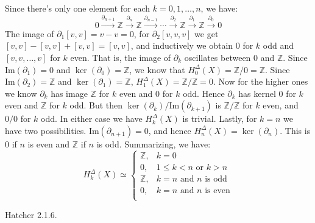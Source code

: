 \documentclass{book}                                                           %
\begin{document}
\begin{solution}
    Since there's only one element for each $k=0,1,\dots,n$, we have:
    \begin{equation}
        0\overset{\partial_{n+1}}{\longrightarrow}\mathbb{Z}
        \overset{\partial_{n}}{\longrightarrow}\mathbb{Z}
        \overset{\partial_{n-1}}{\longrightarrow}
        \cdots
        \overset{\partial_{2}}{\longrightarrow}\mathbb{Z}
        \overset{\partial_{1}}{\longrightarrow}\mathbb{Z}
        \overset{\partial_{0}}{\longrightarrow}0
    \end{equation}
    The image of $\partial_{1}[v,v]=v-v=0$, for $\partial_{2}[v,v,v]$ we get
    $[v,v]-[v,v]+[v,v]=[v,v]$, and inductively we obtain $0$ for $k$ odd and
    $[v,v,\dots,v]$ for $k$ even. That is, the image of $\partial_{k}$
    oscillates between $0$ and $\mathbb{Z}$. Since $\textrm{Im}(\partial_{1})=0$
    and $\ker(\partial_{0})=\mathbb{Z}$, we know that
    $H_{0}^{\Delta}(X)=\mathbb{Z}/0=\mathbb{Z}$. Since
    $\textrm{Im}(\partial_{2})=\mathbb{Z}$ and $\ker(\partial_{1})=\mathbb{Z}$,
    $H_{1}^{\Delta}(X)=\mathbb{Z}/\mathbb{Z}=0$. Now for the higher ones we
    know $\partial_{k}$ has image $\mathbb{Z}$ for $k$ even and $0$ for $k$
    odd. Hence $\partial_{k}$ has kernel $0$ for $k$ even and $\mathbb{Z}$
    for $k$ odd. But then $\ker(\partial_{k})/\textrm{Im}(\partial_{k+1})$
    is $\mathbb{Z}/\mathbb{Z}$ for $k$ even, and $0/0$ for $k$ odd. In
    either case we have $H_{k}^{\Delta}(X)$ is trivial. Lastly, for $k=n$
    we have two possibilities.  $\textrm{Im}(\partial_{n+1})=0$, and hence
    $H_{n}^{\Delta}(X)=\ker(\partial_{n})$. This is $0$ if $n$ is even and
    $\mathbb{Z}$ if $n$ is odd. Summarizing, we have:
    \begin{equation}
        H_{k}^{\Delta}(X)\simeq
        \begin{cases}
            \mathbb{Z},&k=0\\
            0,&1\leq{k}<n\text{ or }k>n\\
            \mathbb{Z},&k=n\text{ and }n\text{ is odd}\\
            0,&k=n\text{ and }n\text{ is even}\\
        \end{cases}
    \end{equation}
\end{solution}
\begin{problem}
    Hatcher 2.1.6.
\end{problem}
\end{document}
